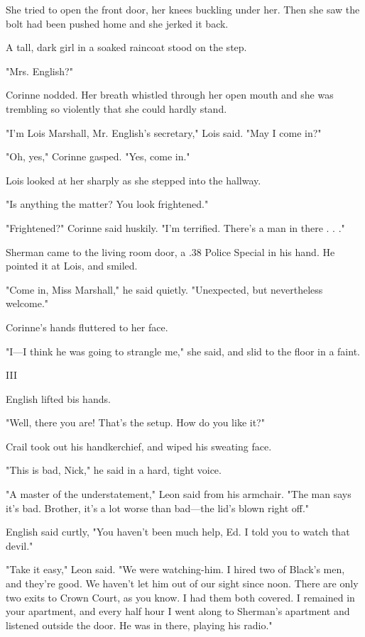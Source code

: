 \documentclass{novel}
\begin{document}
She tried to open the front door, her knees buckling under her. Then she saw the bolt had been pushed home and she jerked it back.

A tall, dark girl in a soaked raincoat stood on the step.

"Mrs. English?"

Corinne nodded. Her breath whistled through her open mouth and she was trembling so violently that she could hardly stand.

"I'm Lois Marshall, Mr. English's secretary," Lois said. "May I come in?"

"Oh, yes," Corinne gasped. "Yes, come in."

Lois looked at her sharply as she stepped into the hallway.

"Is anything the matter? You look frightened."

"Frightened?" Corinne said huskily. "I'm terrified. There's a man in there . . ."

Sherman came to the living room door, a .38 Police Special in his hand. He pointed it at Lois, and smiled.

"Come in, Miss Marshall," he said quietly. "Unexpected, but nevertheless welcome."

Corinne's hands fluttered to her face.

"I—I think he was going to strangle me," she said, and slid to the floor in a faint.



III

English lifted bis hands.

"Well, there you are! That's the setup. How do you like it?"

Crail took out his handkerchief, and wiped his sweating face.

"This is bad, Nick," he said in a hard, tight voice.

"A master of the understatement," Leon said from his armchair. "The man says it's bad. Brother, it's a lot worse than bad—the lid's blown right off."

English said curtly, "You haven't been much help, Ed. I told you to watch that devil."

"Take it easy," Leon said. "We were watching-him. I hired two of Black's men, and they're good. We haven't let him out of our sight since noon. There are only two exits to Crown Court, as you know. I had them both covered. I remained in your apartment, and every half hour I went along to Sherman's apartment and listened outside the door. He was in there, playing his radio."
\end{document}
